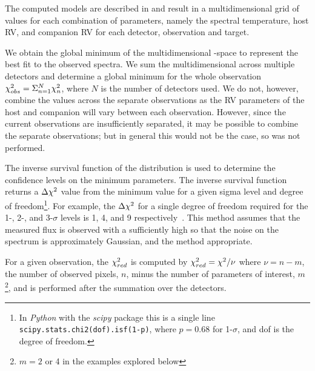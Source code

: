 The computed models are described in  and result in a multidimensional grid of \textchisquared{} values for each combination of parameters, namely the spectral temperature, host {RV}, and companion {RV} for each detector, observation and target.

We obtain the global minimum of the multidimensional \textchisquared-space to represent the best fit to the observed spectra. We sum the multidimensional \textchisquared{} across multiple detectors and determine a global minimum \textchisquared{} for the whole observation \({\chi}^{2}_{obs} = \Sigma^{N}_{n=1} {\chi}^{2}_n\), where \(N\) is the number of detectors used. We do not, however, combine the \textchisquared{} values across the separate observations as the {RV} parameters of the host and companion will vary between each observation. However, since the current observations are insufficiently separated, it may be possible to combine the separate observations; but in general this would not be the case, so was not performed.

The inverse survival function of the \textchisquared{} distribution is used to determine the confidence levels on the minimum \textchisquared{} parameters. The inverse survival function returns a \(\Delta{\chi}^{2}\) value from the minimum \textchisquared{} value for a given sigma level and degree of freedom\footnote{In \emph{Python} with the \emph{scipy} package this is a single line \texttt{scipy.stats.chi2{(dof)}.isf{(1-p)}}, where \(p = 0.68\) for 1-\(\sigma\), and dof is the degree of freedom.}.
For example, the \(\Delta {\chi}^{2}\) for a single degree of freedom required for the 1-, 2-, and 3-\(\sigma\) levels is 1, 4, and 9 respectively~\citep{bevington_data_2003}. This method assumes that the measured flux is observed with a \snr{} sufficiently high so that the noise on the spectrum is approximately Gaussian, and the \textchisquared{} method appropriate.

For a given observation, the \({\chi}^{2}_{red}\) is computed by \({\chi}^{2}_{red} = {\chi}^{2} / \nu\) where \(\nu = n - m\), the number of observed pixels, \(n\), minus the number of parameters of interest, \(m\)\footnote{\(m=2\) or 4 in the examples explored below}, and is performed after the summation over the detectors.




